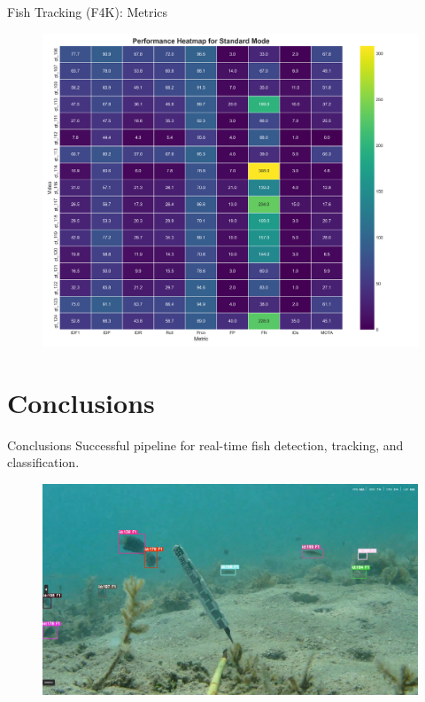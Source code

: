\documentclass[serif]{beamer}  %
\begin{document}
\begin{frame}{Fish Tracking (F4K): Metrics}

\begin{figure}
    \centering
    \includegraphics[width=0.8\linewidth]{images/standard_performance_heatmap.png}
\end{figure}
    
\end{frame}






\section{Conclusions}

\begin{frame}{Conclusions}
    Successful pipeline for real-time fish detection, tracking, and classification.
    \vspace{1.5em}
    \begin{figure}
        \centering
        \includegraphics[width=0.8\linewidth]{images/video_screenshot.png}
    \end{figure}

\end{frame}
\end{document}
